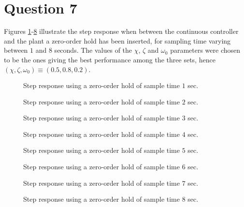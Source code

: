 \section{Question 7}

Figures \ref{fig:Q7.1}-\ref{fig:Q7.8} illustrate the step response when between
the continuous controller and the plant a zero-order hold has been inserted, for
sampling time varying between $1$ and $8$ seconds. The values of the $\chi$,
$\zeta$ and $\omega_0$ parameters were chosen to be the ones giving the best
performance among the three sets,
hence $(\chi, \zeta, \omega_0) \equiv (0.5, 0.8, 0.2)$.

\begin{figure}[H]\centering
	\centering
	\scalebox{1}{}
  \caption{Step response using a zero-order hold of sample time $1$ sec.}
  \label{fig:Q7.1}
\end{figure}

\begin{figure}[H]\centering
	\centering
	\scalebox{1}{}
  \caption{Step response using a zero-order hold of sample time $2$ sec.}
  \label{fig:Q7.2}
\end{figure}

\begin{figure}[H]\centering
	\centering
	\scalebox{1}{}
  \caption{Step response using a zero-order hold of sample time $3$ sec.}
  \label{fig:Q7.3}
\end{figure}

\begin{figure}[H]\centering
	\centering
	\scalebox{1}{}
  \caption{Step response using a zero-order hold of sample time $4$ sec.}
  \label{fig:Q7.4}
\end{figure}

\begin{figure}[H]\centering
	\centering
	\scalebox{1}{}
  \caption{Step response using a zero-order hold of sample time $5$ sec.}
  \label{fig:Q7.5}
\end{figure}

\begin{figure}[H]\centering
	\centering
	\scalebox{1}{}
  \caption{Step response using a zero-order hold of sample time $6$ sec.}
  \label{fig:Q7.6}
\end{figure}

\begin{figure}[H]\centering
	\centering
	\scalebox{1}{}
  \caption{Step response using a zero-order hold of sample time $7$ sec.}
  \label{fig:Q7.7}
\end{figure}

\begin{figure}[H]\centering
	\centering
	\scalebox{1}{}
  \caption{Step response using a zero-order hold of sample time $8$ sec.}
  \label{fig:Q7.8}
\end{figure}
